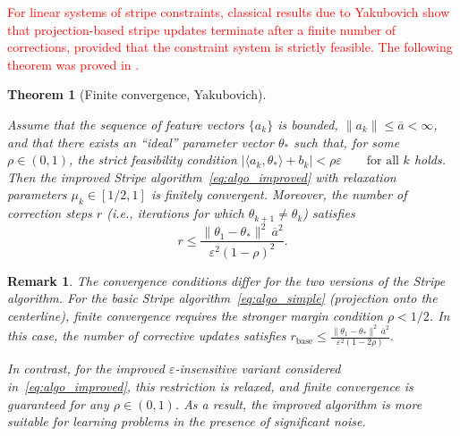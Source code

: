 \documentclass[a4paper,fleqn]{cas-sc}
\newtheorem{theorem}{Theorem}
\newtheorem{remark}{Remark}
\begin{document}

\textcolor{red}{For linear systems of stripe constraints, classical results due to Yakubovich show that projection-based stripe updates terminate after a finite number of corrections, provided that the constraint system is strictly feasible. The following theorem was proved in \cite{Yakubovich1966Recurrent}.}

\begin{theorem}[Finite convergence, Yakubovich]
\label{thm:convergence}

Assume that the sequence of feature vectors $\{a_k\}$ is bounded,
$\|a_k\| \le \overline{a} < \infty$,
and that there exists an ``ideal'' parameter vector $\theta_\ast$
such that, for some $\rho \in (0,1)$, the strict feasibility condition
$
    \left| \langle a_k, \theta_\ast \rangle + b_k \right|
    < \rho \varepsilon
    \qquad \text{for all } k
$
holds.
Then the improved Stripe algorithm~\eqref{eq:algo_improved}
with relaxation parameters $\mu_k \in [1/2,1]$
is finitely convergent.
Moreover, the number of correction steps $r$ (i.e., iterations for which $\theta_{k+1} \neq \theta_k$) satisfies 
\begin{equation}
    r \le
    \frac{\|\theta_1 - \theta_\ast\|^2 \, \overline{a}^2}
         {\varepsilon^2 (1-\rho)^2}.
\end{equation}
\end{theorem}


\begin{remark}
The convergence conditions differ for the two versions of the Stripe algorithm.
For the basic Stripe algorithm~\eqref{eq:algo_simple}
(projection onto the centerline),
finite convergence requires the stronger margin condition $\rho < 1/2$.
In this case, the number of corrective updates satisfies
$
    r_{\mathrm{base}} \le
    \frac{\|\theta_1 - \theta_\ast\|^2 \, \overline{a}^2}
         {\varepsilon^2 (1 - 2\rho)}.
$

In contrast, for the improved $\varepsilon$-insensitive variant
considered in~\eqref{eq:algo_improved},
this restriction is relaxed, and finite convergence is guaranteed
for any $\rho \in (0,1)$.
As a result, the improved algorithm is more suitable for learning
problems in the presence of significant noise.
\end{remark}
\end{document}
